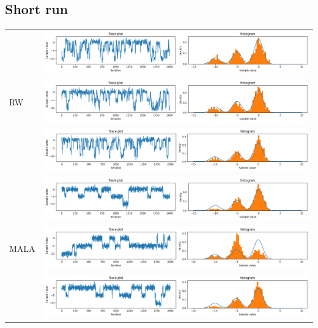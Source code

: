 \documentclass{article}
\theoremstyle{definition}
\newcommand{\1}{\mathbbm{1}}
\begin{document}
{\renewcommand{\arraystretch}{4}%
\subsection{Short run}


	\begin{tabular}{|l|l|}
		\hline
		\multirow{3}{*}{RW} & \multicolumn{1}{l}{\includegraphics[width=0.8\linewidth, height=0.1\linewidth, valign=m]{diagnostics/rw1.png}} \\
							& \multicolumn{1}{l}{\includegraphics[width=0.8\linewidth, height=0.1\linewidth, valign=m]{diagnostics/rw2.png}} \\
							& \multicolumn{1}{l}{\includegraphics[width=0.8\linewidth, height=0.1\linewidth, valign=m]{diagnostics/rw3.png}} \\
		\hline
		
		\multirow{3}{*}{MALA} & \multicolumn{1}{l}{\includegraphics[width=0.8\linewidth, height=0.1\linewidth, valign=m]{diagnostics/mala1.png}} \\
& \multicolumn{1}{l}{\includegraphics[width=0.8\linewidth, height=0.1\linewidth, valign=m]{diagnostics/mala2.png}} \\
& \multicolumn{1}{l}{\includegraphics[width=0.8\linewidth, height=0.1\linewidth, valign=m]{diagnostics/mala3.png}} \\
\hline


\end{tabular}}
\end{document}

